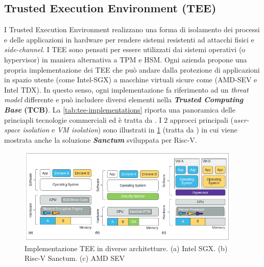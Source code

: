 \documentclass{article}
\begin{document}
\subsection{Trusted Execution Environment (TEE)}
I Trusted Execution Environment realizzano una forma di isolamento dei processi e delle applicazioni in hardware per rendere sistemi resistenti ad attacchi fisici e \textit{side-channel}. I TEE sono pensati per essere utilizzati dai sistemi operativi (o hypervisor) in maniera alternativa a TPM e HSM. Ogni azienda propone una propria implementazione dei TEE che può andare dalla protezione di applicazioni in spazio utente (come Intel-SGX) a macchine virtuali sicure come (AMD-SEV e Intel TDX).  In questo senso, ogni implementazione fa riferimento ad un \textit{threat model} differente e può includere diversi elementi nella \textbf{\textit{Trusted Computing Base} (TCB)}. La \cref{tab:tee-implementations} riporta una panoramica delle princiapli tecnologie commerciali ed è tratta da \cite{Jauernig2020}. I $2$ approcci principali (\textit{user-space isolation} e \textit{VM isolation}) sono illustrati in \cref{fig:tee-implementations} (tratta da \cite{Jauernig2020}) in cui viene mostrata anche la soluzione \textbf{\textit{Sanctum}} sviluppata per Risc-V.

\begin{figure}[h]
  \begin{center}
    \includegraphics[width=0.95\textwidth]{figures/ch1/tee-implementations.png}
  \end{center}
  \caption{Implementazione TEE in diverse architetture. (a) Intel SGX. (b) Risc-V Sanctum. (c) AMD SEV}\label{fig:tee-implementations}
\end{figure}
\end{document}
